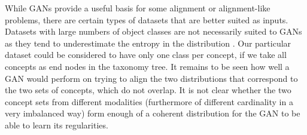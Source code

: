 While GANs provide a useful basis for some alignment or alignment-like problems, there are certain types of datasets that are better suited as inputs. Datasets with large numbers of object classes are not necessarily suited to GANs as they tend to underestimate the entropy in the distribution \cite{ImprovedTechniquesTrainingGANS} . Our particular dataset could be considered to have only one class per concept, if we take all concepts as end nodes in the taxonomy tree. It remains to be seen how well a GAN would perform on trying to align the two distributions that correspond to the two sets of concepts, which do not overlap. It is not clear whether the two concept sets from different modalities (furthermore of different cardinality in a very imbalanced way) form enough of a coherent distribution for the GAN to be able to learn its regularities. 





